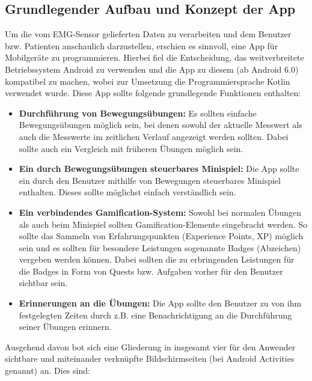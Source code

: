 \subsection{Grundlegender Aufbau und Konzept der App}
Um die vom EMG-Sensor gelieferten Daten zu verarbeiten und dem Benutzer bzw. Patienten anschaulich darzustellen, erschien es sinnvoll, eine App für Mobilgeräte zu programmieren. Hierbei fiel die Entscheidung, das weitverbreitete Betriebssystem Android zu verwenden und die App zu diesem (ab Android 6.0) kompatibel zu machen, wobei zur Umsetzung die Programmiersprache Kotlin\cite{Src:Kotlin} verwendet wurde. Diese App sollte folgende grundlegende Funktionen enthalten:
\begin{itemize}
	\item \textbf{Durchführung von Bewegungsübungen:} Es sollten einfache Bewegungsübungen möglich sein, bei denen sowohl der aktuelle Messwert als auch die Messwerte im zeitlichen Verlauf angezeigt werden sollten. Dabei sollte auch ein Vergleich mit früheren Übungen möglich sein.
	\item \textbf{Ein durch Bewegungsübungen steuerbares Minispiel:} Die App sollte ein durch den Benutzer mithilfe von Bewegungen steuerbares Minispiel enthalten. Dieses sollte möglichst einfach verständlich sein.
	\item \textbf{Ein verbindendes Gamification-System:} Sowohl bei normalen Übungen als auch beim Minispiel sollten Gamification-Elemente eingebracht werden. So sollte das Sammeln von Erfahrungspunkten (Experience Points, XP) möglich sein und es sollten für besondere Leistungen sogenannte Badges (Abzeichen) vergeben werden können. Dabei sollten die zu erbringenden Leistungen für die Badges in Form von Quests bzw. Aufgaben vorher für den Benutzer sichtbar sein.
	\item \textbf{Erinnerungen an die Übungen:} Die App sollte den Benutzer zu von ihm festgelegten Zeiten durch z.B. eine Benachrichtigung an die Durchführung seiner Übungen erinnern.
\end{itemize}
Ausgehend davon bot sich eine Gliederung in insgesamt vier für den Anwender sichtbare und miteinander verknüpfte Bildschirmseiten (bei Android Activities\cite{Src:AndroidKuenneth} genannt) an. Dies sind:
